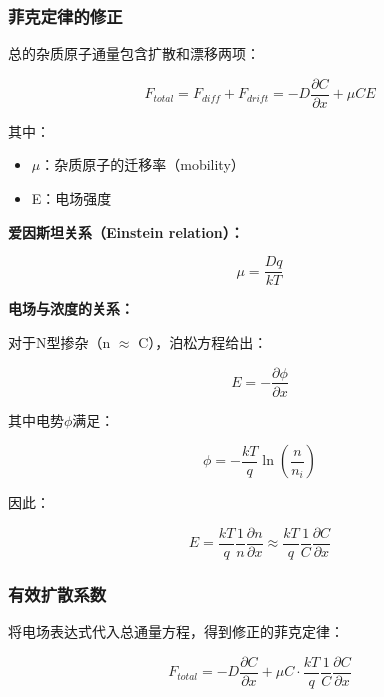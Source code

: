 \documentclass[UTF8,12pt,a4paper]{ctexart}
\begin{document}
\subsubsection{菲克定律的修正}

总的杂质原子通量包含扩散和漂移两项：

\begin{equation}
F_{total} = F_{diff} + F_{drift} = -D\frac{\partial C}{\partial x} + \mu C E
\end{equation}

其中：
\begin{itemize}
    \item $\mu$：杂质原子的迁移率（mobility）
    \item E：电场强度
\end{itemize}

\textbf{爱因斯坦关系（Einstein relation）：}

\begin{equation}
\mu = \frac{Dq}{kT}
\end{equation}

\textbf{电场与浓度的关系：}

对于N型掺杂（n $\approx$ C），泊松方程给出：

\begin{equation}
E = -\frac{\partial \phi}{\partial x}
\end{equation}

其中电势$\phi$满足：

\begin{equation}
\phi = -\frac{kT}{q} \ln\left(\frac{n}{n_i}\right)
\end{equation}

因此：

\begin{equation}
E = \frac{kT}{q} \frac{1}{n} \frac{\partial n}{\partial x} \approx \frac{kT}{q} \frac{1}{C} \frac{\partial C}{\partial x}
\end{equation}

\subsubsection{有效扩散系数}

将电场表达式代入总通量方程，得到修正的菲克定律：

\begin{equation}
F_{total} = -D\frac{\partial C}{\partial x} + \mu C \cdot \frac{kT}{q} \frac{1}{C} \frac{\partial C}{\partial x}
\end{equation}
\end{document}
